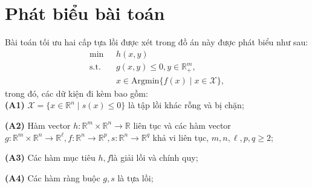 \section{Phát biểu bài toán}
Bài toán tối ưu hai cấp tựa lồi được xét trong đồ án này được phát biểu như sau:
\begin{align}
    \min \  &{h}(x,y) \tag*{(QBP)}\label{prob_QBP} \\
    \text{s.t.} \quad & {g}(x,y) \leq 0, y\in\mathbb{R}_{+}^{m}, \nonumber\\ 
                     & x \in {\text{Argmin}}\{f(x) \mid x\in \mathcal{X}\},  \nonumber
\end{align}
trong đó, các dữ kiện đi kèm bao gồm:\\
\noindent \textbf{(A1)} $\mathcal{X} = \{x \in \mathbb{R}^n \mid s(x)\leq 0 \}$ là tập lồi khác rỗng và bị chặn; 

\noindent \textbf{(A2)} Hàm vector ${h}: \mathbb{R}^m \times \mathbb{R}^n \rightarrow \mathbb{R}$ liên tục và các hàm vector ${g}: \mathbb{R}^m \times \mathbb{R}^n \rightarrow \mathbb{R}^{\ell}, {f}: \mathbb{R}^n \rightarrow \mathbb{R}^p, {s}: \mathbb{R}^n \rightarrow \mathbb{R}^q$ khả vi liên tục, $m, n, \ell, p , q \geq 2$;

\noindent \textbf{(A3)} Các hàm mục tiêu $h, f$là giải lồi và chính quy; 

\noindent \textbf{(A4)} Các hàm ràng buộc $g, s$ là tựa lồi;

